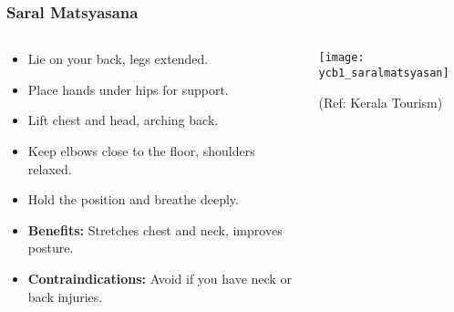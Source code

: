 \begin{frame}[fragile]\frametitle{Saral Matsyasana}
\begin{columns}
    \begin{column}[T]{0.5\linewidth}
      \begin{itemize}
        \item Lie on your back, legs extended.
        \item Place hands under hips for support.
        \item Lift chest and head, arching back.
        \item Keep elbows close to the floor, shoulders relaxed.
        \item Hold the position and breathe deeply.
        \item \textbf{Benefits:} Stretches chest and neck, improves posture.
        \item \textbf{Contraindications:} Avoid if you have neck or back injuries.
      \end{itemize}
    \end{column}
    \begin{column}[T]{0.5\linewidth}
        \begin{center}
        \begin{center}
		        \texttt{[image: ycb1\_saralmatsyasan]}
				
				{\tiny (Ref: Kerala Tourism)}	        
		\end{center}   
        \end{center}    
    \end{column}
  \end{columns}
\end{frame}

